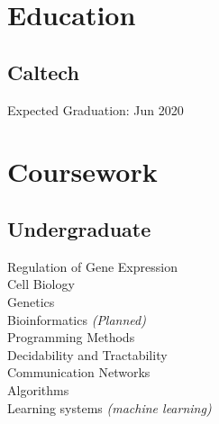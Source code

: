 \documentclass[]{resume}
\begin{document}
\begin{minipage}[t]{0.33\textwidth}


\section{Education}
\subsection{Caltech}
Expected Graduation: Jun 2020\\
\sectionsep




\section{Coursework}
\subsection{Undergraduate}
Regulation of Gene Expression \\
Cell Biology \\
Genetics \\
Bioinformatics {\footnotesize \textit{(Planned)}}\\
\sectionsep
{}
Programming Methods \\
Decidability and Tractability \\
Communication Networks \\
Algorithms \\
Learning systems {\footnotesize \textit{(machine learning)}}\\
\sectionsep


\end{minipage}
\end{document}
